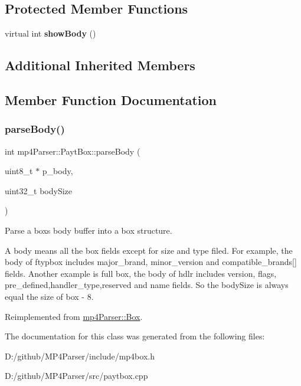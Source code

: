\subsection*{Protected Member Functions}
\begin{DoxyCompactItemize}
\item 
\mbox{\label{classmp4_parser_1_1_payt_box_aca766827b84b49a2c246fcbfa8ffa004}} 
virtual int {\bfseries show\+Body} ()
\end{DoxyCompactItemize}
\subsection*{Additional Inherited Members}


\subsection{Member Function Documentation}
\mbox{\label{classmp4_parser_1_1_payt_box_a95e5ecabf06b6fa4b3238fe2a495f9b3}} 
\subsubsection{\texorpdfstring{parseBody()}{parseBody()}}
{\footnotesize\ttfamily int mp4\+Parser\+::\+Payt\+Box\+::parse\+Body (\begin{DoxyParamCaption}\item[{uint8\+\_\+t $\ast$}]{p\+\_\+body,  }\item[{uint32\+\_\+t}]{body\+Size }\end{DoxyParamCaption})\hspace{0.3cm}{\ttfamily [virtual]}}



Parse a box\textquotesingle{}s body buffer into a box structure. 

A body means all the box fields except for size and type filed. For example, the body of ftypbox includes major\+\_\+brand, minor\+\_\+version and compatible\+\_\+brands\mbox{[}\mbox{]} fields. Another example is full box, the body of hdlr includes version, flags, pre\+\_\+defined,handler\+\_\+type,reserved and name fields. So the body\+Size is always equal the size of box -\/ 8. 

Reimplemented from \mbox{\hyperlink{classmp4_parser_1_1_box_a3dd0c084ac65bc77b69ac5ecaf796cb2}{mp4\+Parser\+::\+Box}}.



The documentation for this class was generated from the following files\+:\begin{DoxyCompactItemize}
\item 
D\+:/github/\+M\+P4\+Parser/include/mp4box.\+h\item 
D\+:/github/\+M\+P4\+Parser/src/paytbox.\+cpp\end{DoxyCompactItemize}

